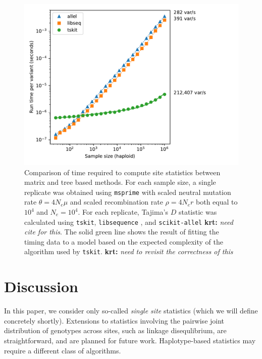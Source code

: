 \documentclass{article}
\newcommand{\krt}[1]{{\color{green}\textbf{krt:} \it #1}}
\begin{document}
\begin{figure}
    \centering
    \includegraphics{tskit_stat_benchmarks/benchmarks_without_copy_longer_genome.pdf}
    \caption{Comparison of time required to compute site statistics
        between matrix and tree based methods. For each sample size, a single replicate
        was obtained using \texttt{msprime} with scaled neutral mutation rate $\theta = 4N_e\mu$ and
        scaled recombination rate $\rho = 4N_er$ both equal to $10^4$ and $N_e = 10^4$. For each replicate, Tajima's $D$
        \citep{Tajima1989-de} statistic was calculated using \texttt{tskit}, \texttt{libsequence}
        \citep{Thornton2003-wj}, and \texttt{scikit-allel} \krt{need cite for this}.
        The solid green line shows the result of fitting the timing data to a model based on the expected complexity of the 
        algorithm used by \texttt{tskit}. \krt{need to revisit the correctness of this}
        \label{fig:stats_performance}
    }
\end{figure}




\section*{Discussion}

In this paper,
we consider only so-called \emph{single site} statistics
(which we will define concretely shortly).
Extensions to statistics involving the pairwise joint distribution of genotypes across sites,
such as linkage disequlibrium,
are straightforward, and are planned for future work.
Haplotype-based statistics may require a different class of algorithms.
\end{document}
